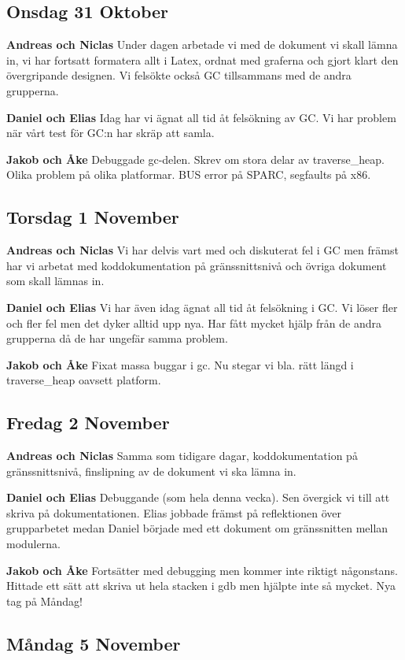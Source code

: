 \documentclass{article}
\begin{document}
\subsection{Onsdag 31 Oktober}
{\bf Andreas och Niclas}
Under dagen arbetade vi med de dokument vi skall lämna in, vi har fortsatt formatera allt i Latex, ordnat med graferna och gjort klart den övergripande designen. Vi felsökte också GC tillsammans med de andra grupperna.

{\bf Daniel och Elias}
Idag har vi ägnat all tid åt felsökning av GC. Vi har problem när vårt test för GC:n har skräp att samla.

{\bf Jakob och Åke}
Debuggade gc-delen. Skrev om stora delar av traverse\_heap. Olika problem på olika platformar. BUS error på SPARC, segfaults på x86.

\subsection{Torsdag 1 November}
{\bf Andreas och Niclas} Vi har delvis vart med och diskuterat fel i GC men främst har vi arbetat med koddokumentation på gränssnittsnivå och övriga dokument som skall lämnas in.

{\bf Daniel och Elias} Vi har även idag ägnat all tid åt felsökning i GC. Vi löser fler och fler fel men det dyker alltid upp nya. Har fått mycket hjälp från de andra grupperna då de har ungefär samma problem.

{\bf Jakob och Åke} Fixat massa buggar i gc. Nu stegar vi bla. rätt längd i traverse\_heap oavsett platform.

\subsection{Fredag 2 November}
{\bf Andreas och Niclas} Samma som tidigare dagar, koddokumentation på gränssnittsnivå, finslipning av de dokument vi ska lämna in.

{\bf Daniel och Elias} Debuggande (som hela denna vecka). Sen övergick vi till att skriva på dokumentationen. Elias jobbade främst på reflektionen över grupparbetet medan Daniel började med ett dokument om gränssnitten mellan modulerna.

{\bf Jakob och Åke} Fortsätter med debugging men kommer inte riktigt någonstans. Hittade ett sätt att skriva ut hela stacken i gdb men hjälpte inte så mycket. Nya tag på Måndag!

\subsection{Måndag 5 November}
\end{document}
